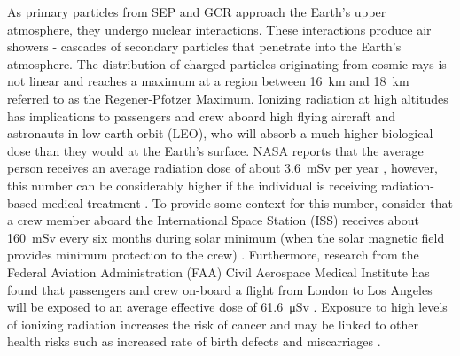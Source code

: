 As primary particles from SEP and GCR approach the Earth's upper atmosphere, they undergo nuclear interactions.  These interactions produce air showers - cascades of secondary particles that penetrate into the Earth's atmosphere. The distribution of charged particles originating from cosmic rays is not linear and reaches a maximum at a region between \SI{16}{\km} and \SI{18}{\km} referred to as the Regener-Pfotzer Maximum\cite{regener}.
%
%
Ionizing radiation at high altitudes has implications to passengers and crew aboard high flying aircraft and astronauts in low earth orbit (LEO), who will absorb a much higher biological dose than they would at the Earth's surface. 
NASA reports that the average person receives an average radiation dose of about \SI{3.6}{\milli\sievert} per year \cite{nasa-dose}, however, this number can be considerably higher if the individual is receiving radiation-based medical treatment \cite{ncrp}.
To provide some context for this number, consider that a crew member aboard the International Space Station (ISS) receives about \SI{160}{\milli\sievert} every six months during solar minimum (when the solar magnetic field provides minimum protection to the crew) \cite{nasa-dose}.
Furthermore, research from the Federal Aviation Administration (FAA) Civil Aerospace Medical Institute has found that passengers and crew on-board a flight from London to Los Angeles will be exposed to an average effective dose of \SI{61.6}{\micro\sievert} \cite{faa}. Exposure to high levels of ionizing radiation increases the risk of cancer and may be linked to other health risks such as increased rate of birth defects and miscarriages \cite{flightatt}. 

